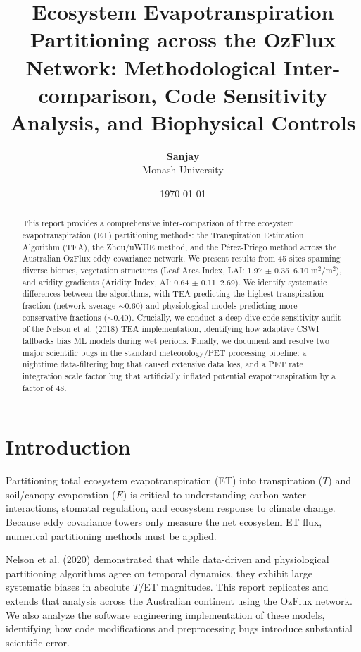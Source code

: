 \documentclass[11pt,a4paper]{article}
\title{\textbf{Ecosystem Evapotranspiration Partitioning across the OzFlux Network: Methodological Inter-comparison, Code Sensitivity Analysis, and Biophysical Controls}}
\author{\textbf{Sanjay} \\ \small Monash University}
\date{\today}
\begin{document}
\maketitle

\begin{abstract}
This report provides a comprehensive inter-comparison of three ecosystem evapotranspiration (ET) partitioning methods: the Transpiration Estimation Algorithm (TEA), the Zhou/uWUE method, and the P\'erez-Priego method across the Australian OzFlux eddy covariance network. We present results from 45 sites spanning diverse biomes, vegetation structures (Leaf Area Index, LAI: 1.97 $\pm$ 0.35--6.10 m$^2$/m$^2$), and aridity gradients (Aridity Index, AI: 0.64 $\pm$ 0.11--2.69). We identify systematic differences between the algorithms, with TEA predicting the highest transpiration fraction (network average $\sim0.60$) and physiological models predicting more conservative fractions ($\sim0.40$). Crucially, we conduct a deep-dive code sensitivity audit of the Nelson et al. (2018) TEA implementation, identifying how adaptive CSWI fallbacks bias ML models during wet periods. Finally, we document and resolve two major scientific bugs in the standard meteorology/PET processing pipeline: a nighttime data-filtering bug that caused extensive data loss, and a PET rate integration scale factor bug that artificially inflated potential evapotranspiration by a factor of 48.
\end{abstract}

\section{Introduction}
Partitioning total ecosystem evapotranspiration (ET) into transpiration ($T$) and soil/canopy evaporation ($E$) is critical to understanding carbon-water interactions, stomatal regulation, and ecosystem response to climate change. Because eddy covariance towers only measure the net ecosystem ET flux, numerical partitioning methods must be applied.

Nelson et al. (2020) demonstrated that while data-driven and physiological partitioning algorithms agree on temporal dynamics, they exhibit large systematic biases in absolute $T$/ET magnitudes. This report replicates and extends that analysis across the Australian continent using the OzFlux network. We also analyze the software engineering implementation of these models, identifying how code modifications and preprocessing bugs introduce substantial scientific error.
\end{document}
